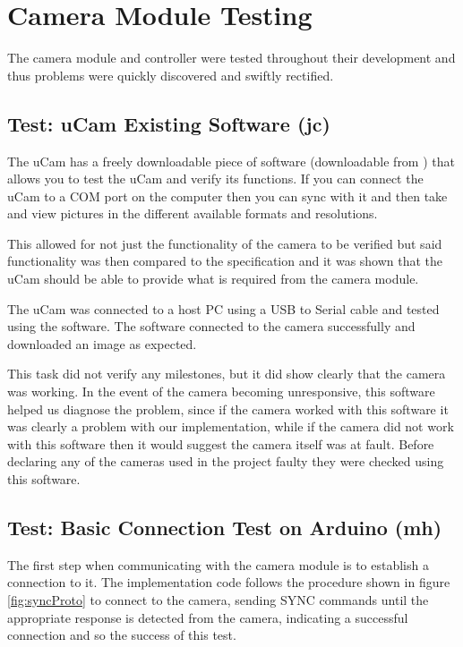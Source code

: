 \section{Camera Module Testing}

The camera module and controller were tested throughout their development and thus problems were quickly discovered and swiftly rectified.

\subsection{Test: uCam Existing Software (jc)}
\label{sec:existing_software_test}

The uCam has a freely downloadable piece of software (downloadable from \cite{ucam_test_software}) that allows you to test the uCam and verify its functions. If you can connect the uCam to a COM port on the computer then you can sync with it and then take and view pictures in the different available formats and resolutions.

This allowed for not just the functionality of the camera to be verified but said functionality was then compared to the specification and it was shown that the uCam should be able to provide what is required from the camera module.

The uCam was connected to a host PC using a USB to Serial cable and tested using the software. The software connected to the camera successfully and downloaded an image as expected.

This task did not verify any milestones, but it did show clearly that the camera was working. In the event of the camera becoming unresponsive, this software helped us diagnose the problem, since if the camera worked with this software it was clearly a problem with our implementation, while if the camera did not work with this software then it would suggest the camera itself was at fault. Before declaring any of the cameras used in the project faulty they were checked using this software.

\subsection{Test: Basic Connection Test on Arduino (mh)}
\label{sec:basic_connection_test}

The first step when communicating with the camera module is to establish a connection to it.  The implementation code follows the procedure shown in figure \ref{fig:syncProto} to connect to the camera, sending SYNC commands until the appropriate response is detected from the camera, indicating a successful connection and so the success of this test.

